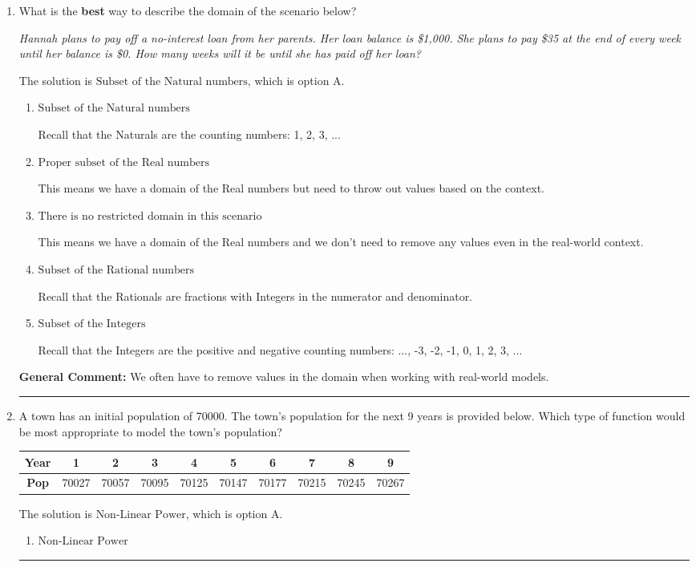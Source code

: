 \documentclass{extbook}[14pt]
\newcommand{\litem}[1]{\item #1

\rule{\textwidth}{0.4pt}}
\begin{document}
\begin{enumerate}\litem{
What is the \textbf{best} way to describe the domain of the scenario below?

\begin{center}
    \textit{ Hannah plans to pay off a no-interest loan from her parents. Her loan balance is \$1,000. She plans to pay \$35 at the end of every week until her balance is \$0. How many weeks will it be until she has paid off her loan? }
\end{center}
The solution is \( \text{Subset of the Natural numbers} \), which is option A.\begin{enumerate}[label=\Alph*.]
\item \( \text{Subset of the Natural numbers} \)

Recall that the Naturals are the counting numbers: 1, 2, 3, ...
\item \( \text{Proper subset of the Real numbers} \)

This means we have a domain of the Real numbers but need to throw out values based on the context.
\item \( \text{There is no restricted domain in this scenario} \)

This means we have a domain of the Real numbers and we don't need to remove any values even in the real-world context.
\item \( \text{Subset of the Rational numbers} \)

Recall that the Rationals are fractions with Integers in the numerator and denominator.
\item \( \text{Subset of the Integers} \)

Recall that the Integers are the positive and negative counting numbers: ..., -3, -2, -1, 0, 1, 2, 3, ... 
\end{enumerate}

\textbf{General Comment:} We often have to remove values in the domain when working with real-world models.
}
\litem{
A town has an initial population of 70000. The town's population for the next 9 years is provided below. Which type of function would be most appropriate to model the town's population?


\begin{tabular}{c|c|c|c|c|c|c|c|c|c}
\textbf{Year} &1 &2 &3 &4 &5 &6 &7 &8 &9\tabularnewline \hline
\textbf{Pop} &70027 &70057 &70095 &70125 &70147 &70177 &70215 &70245 &70267\end{tabular}The solution is \( \text{Non-Linear Power} \), which is option A.\begin{enumerate}[label=\Alph*.]
\item \( \text{Non-Linear Power} \)


\end{enumerate}}
\end{enumerate}
\end{document}

